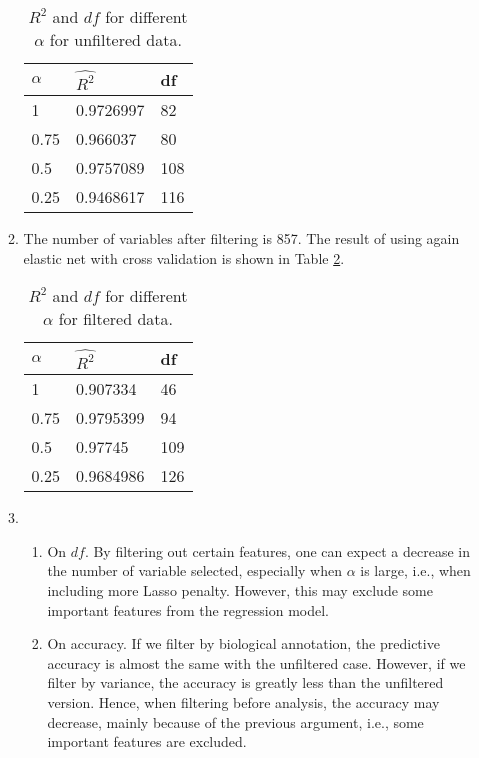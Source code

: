\documentclass{article}
\begin{document}
\begin{enumerate}
\begin{enumerate}
\begin{table}[]
\centering
\begin{tabular}{|l|l|l|}
\hline
$\alpha$ & $\hat{R^2}$ & df  \\ \hline
1       & 0.9726997                                   & 82  \\ \hline
0.75    & 0.966037                                    & 80  \\ \hline
0.5     & 0.9757089                                   & 108 \\ \hline
0.25    & 0.9468617                                   & 116 \\ \hline
\end{tabular}
\label{table1}
\caption{$R^2 $ and $df$ for different $\alpha$ for unfiltered data.}
\end{table}

\item The number of variables after filtering is 857. The result of using again elastic net with cross validation is shown in Table \ref{table2}.

\begin{table}[]
\centering
\begin{tabular}{|l|l|l|}
\hline
$\alpha$ & $\hat{R^2}$ & df  \\ \hline
1       & 0.907334    & 46  \\ \hline
0.75    & 0.9795399   & 94  \\ \hline
0.5     & 0.97745     & 109 \\ \hline
0.25    & 0.9684986   & 126 \\ \hline
\end{tabular}
\label{table2}
\caption{$R^2 $ and $df$ for different $\alpha$ for filtered data.}
\end{table}

\item 
\begin{enumerate}
\item On $df$. By filtering out certain features, one can expect a decrease in the number of variable selected, especially when $\alpha$ is large, i.e., when including more Lasso penalty. However, this may exclude some important features from the regression model.

\item On accuracy. If we filter by biological annotation, the predictive accuracy is almost the same with the unfiltered case. However, if we filter by variance, the accuracy is greatly less than the unfiltered version. Hence, when filtering before analysis, the accuracy may decrease, mainly because of the previous argument, i.e., some important features are excluded. 

\end{enumerate}

\end{enumerate}

\end{enumerate}
\end{document}
